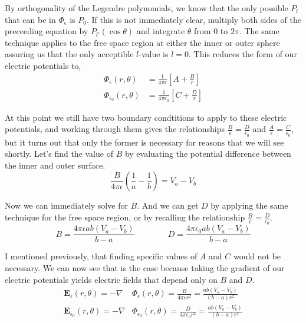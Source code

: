 \documentclass[10pt,a4paper]{article}
\begin{document}
By orthogonality of the Legendre polynomials, we know that the only possible $P_l$ that can be in $\Phi_\epsilon$ is $P_0$.  If this is not immediately clear, multiply both sides of the preceeding equation by $P_{l'}(\cos\theta)$ and integrate $\theta$ from $0$ to $2\pi$.  The same technique applies to the free space region at either the inner or outer sphere assuring us that the only acceptible $l$-value is $l=0$.  This reduces the form of our electric potentials to,
\begin{subequations}\begin{align}
\Phi_\epsilon(r, \theta)&=\frac{1}{4\pi\epsilon}\left[A+\frac{B}{r}\right] \\
\Phi_{\epsilon_0}(r, \theta)&=\frac{1}{4\pi\epsilon_0}\left[C+\frac{D}{r}\right]
\end{align}\end{subequations}

At this point we still have two boundary condtitions to apply to these electric potentials, and working through them gives the relationships $\frac{B}{\epsilon}=\frac{D}{\epsilon_0}$ and $\frac{A}{\epsilon}=\frac{C}{\epsilon_0}$, but it turns out that only the former is necessary for reasons that we will see shortly.  Let's find the value of $B$ by evaluating the potential difference between the inner and outer surface.
\begin{equation}
\frac{B}{4\pi\epsilon}\left(\frac{1}{a}-\frac{1}{b}\right)=V_a-V_b
\end{equation}

Now we can immediately solve for $B$.  And we can get $D$ by applying the same technique for the free space region, or by recalling the relationship $\frac{B}{\epsilon}=\frac{D}{\epsilon_0}$.
\begin{equation}
B=\frac{4\pi\epsilon ab(V_a-V_b)}{b-a} \qquad \qquad
D=\frac{4\pi\epsilon_0 ab(V_a-V_b)}{b-a}
\end{equation}

I mentioned previously, that finding specific values of $A$ and $C$ would not be necessary.  We can now see that is the case because taking the gradient of our electric potentials yields electric fields that depend only on $B$ and $D$.
\begin{subequations}\begin{align}
\mathbf{E}_\epsilon(r, \theta)=-\nabla&\Phi_\epsilon(r, \theta)=\frac{B}{4\pi\epsilon r^2} = \frac{ab(V_a-V_b)}{(b-a)r^2}\\
\mathbf{E}_{\epsilon_0}(r, \theta)=-\nabla&\Phi_{\epsilon_0}(r, \theta)=\frac{D}{4\pi\epsilon_0 r^2} = \frac{ab(V_a-V_b)}{(b-a)r^2}
\end{align}\end{subequations}
\end{document}
